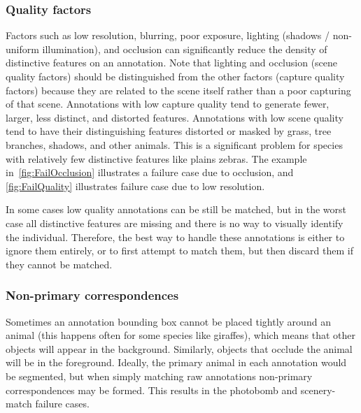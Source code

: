         \subsubsection{Quality factors}
            Factors such as low resolution, blurring, poor exposure, lighting (shadows / non-uniform illumination),
            and occlusion can significantly reduce the density of distinctive features on an annotation. Note that
            lighting and occlusion (scene quality factors) should be distinguished from the other factors (capture
            quality factors) because they are related to the scene itself rather than a poor capturing of that
            scene. Annotations with low capture quality tend to generate fewer, larger, less distinct, and
            distorted features. Annotations with low scene quality tend to have their distinguishing features
            distorted or masked by grass, tree branches, shadows, and other animals. This is a significant problem
            for species with relatively few distinctive features like plains zebras. The example
            in~\cref{fig:FailOcclusion} illustrates a failure case due to occlusion, and \cref{fig:FailQuality}
            illustrates failure case due to low resolution.

            In some cases low quality annotations can be still be matched, but in the worst case all distinctive
            features are missing and there is no way to visually identify the individual. Therefore, the best way
            to handle these annotations is either to ignore them entirely, or to first attempt to match them, but
            then discard them if they cannot be matched.

            \FailOcclusion{}
            \FailQuality{}

        \FloatBarrier{}
          \subsubsection{Non-primary correspondences}
            Sometimes an annotation bounding box cannot be placed tightly around an animal (this happens often for
            some species like giraffes), which means that other objects will appear in the background. Similarly,
            objects that occlude the animal will be in the foreground. Ideally, the primary animal in each
            annotation would be segmented, but when simply matching raw annotations non-primary correspondences may
            be formed. This results in the photobomb and scenery-match failure cases.

